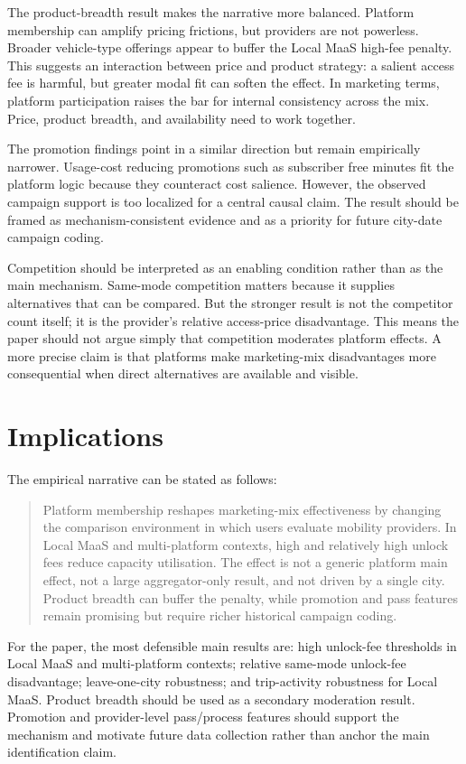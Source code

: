 \documentclass[11pt]{article}
\begin{document}
The product-breadth result makes the narrative more balanced. Platform membership can
amplify pricing frictions, but providers are not powerless. Broader vehicle-type offerings
appear to buffer the Local MaaS high-fee penalty. This suggests an interaction between price
and product strategy: a salient access fee is harmful, but greater modal fit can soften the
effect. In marketing terms, platform participation raises the bar for internal consistency
across the mix. Price, product breadth, and availability need to work together.

The promotion findings point in a similar direction but remain empirically narrower.
Usage-cost reducing promotions such as subscriber free minutes fit the platform logic
because they counteract cost salience. However, the observed campaign support is too
localized for a central causal claim. The result should be framed as mechanism-consistent
evidence and as a priority for future city-date campaign coding.

Competition should be interpreted as an enabling condition rather than as the main
mechanism. Same-mode competition matters because it supplies alternatives that can be
compared. But the stronger result is not the competitor count itself; it is the provider's
relative access-price disadvantage. This means the paper should not argue simply that
competition moderates platform effects. A more precise claim is that platforms make
marketing-mix disadvantages more consequential when direct alternatives are available and
visible.

\section{Implications}

The empirical narrative can be stated as follows:

\begin{quote}
Platform membership reshapes marketing-mix effectiveness by changing the comparison
environment in which users evaluate mobility providers. In Local MaaS and multi-platform
contexts, high and relatively high unlock fees reduce capacity utilisation. The effect is
not a generic platform main effect, not a large aggregator-only result, and not driven by a
single city. Product breadth can buffer the penalty, while promotion and pass features
remain promising but require richer historical campaign coding.
\end{quote}

For the paper, the most defensible main results are: high unlock-fee thresholds in Local
MaaS and multi-platform contexts; relative same-mode unlock-fee disadvantage; leave-one-city
robustness; and trip-activity robustness for Local MaaS. Product breadth should be used as
a secondary moderation result. Promotion and provider-level pass/process features should
support the mechanism and motivate future data collection rather than anchor the main
identification claim.
\end{document}
